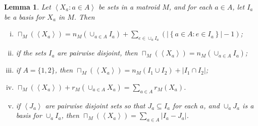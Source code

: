 \documentclass{amsart}
\theoremstyle{plain}
\newtheorem{lemma}[theorem]{Lemma}
\theoremstyle{definition}
\newcommand{\abs}[1]{\left| #1 \right|}
\newcommand{\set}[1]{\left\{#1\right\}}
\newcommand{\br}[1]{\left(#1\right)}
\newcommand{\ab}[1]{\left\langle#1\right\rangle}
\renewcommand{\ss}{\subseteq}
\newcommand{\setof}[2]{\set{{#1} : {#2}}}
\begin{document}
\begin{lemma}\label{mlcprop}
  Let $\ab{X_a : a \in A}$ be sets in a matroid $M$, 
  and for each $a \in A$, let $I_a$ be a basis for $X_a$ in $M$. Then 
  \begin{enumerate}[(i)]
    \item\label{mlcndj} $\sqcap_M(\ab{X_a}) 
    = n_M\br{\cup_{a \in A}I_a} + \sum_{e \in \cup_a I_a} \br{\abs{\setof{a \in A}{e \in I_a}}-1}$;
    \item\label{mlcdj} if the sets $I_a$ are pairwise disjoint, 
    then $\sqcap_M(\ab{X_a}) = n_M(\cup_{a \in A}I_a)$;
    \item\label{mlcpair} 
      if $A = \{1,2\}$, then $\sqcap_M(\ab{X_a}) = n_M(I_1 \cup I_2) + |I_1 \cap I_2|$;
    \item\label{mlcrank} $\sqcap_M(\ab{X_a}) + r_M\br{\cup_{a \in A} X_a} = \sum_{a \in A} r_M(X_a)$.
    \item\label{mlcpartbasis} if $\ab{J_a}$ are pairwise disjoint sets so that $J_a \ss I_a$ for each $a$, 
      and $\cup_a J_a$ is a basis for $\cup_a I_a$, 
      then $\sqcap_M(\ab{X_a}) = \sum_{a \in A}|I_a - J_a|$. 
  \end{enumerate}
\end{lemma}
\end{document}
